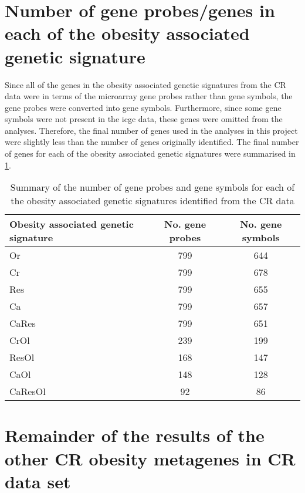 \begin{appendices}
	\section{Number of gene probes/genes in each of the obesity associated genetic signature}
	\label{app:number_of_gene_probes_genes_in_each_signature}

	Since all of the genes in the obesity associated genetic signatures from the CR data were in terms of the microarray gene probes rather than gene symbols, the gene probes were converted into gene symbols.
	Furthermore, since some gene symbols were not present in the \gls{icgc} data, these genes were omitted from the analyses.
	Therefore, the final number of genes used in the analyses in this project were slightly less than the number of genes originally identified.
	The final number of genes for each of the obesity associated genetic signatures were summarised in \cref{tab:signature_gene_num}.

	\begin{table}[htbp]
		\centering
		\caption{Summary of the number of gene probes and gene symbols for each of the obesity associated genetic signatures identified from the CR data}
		\label{tab:signature_gene_num}
		\begin{tabular}{lcc}
			Obesity associated genetic signature & No. gene probes   & No. gene symbols\\
			\hline
			\rule{0pt}{2.25ex}Or & 799 & 644 \\
			Cr                   & 799 & 678 \\
			Res                  & 799 & 655 \\
			Ca                   & 799 & 657 \\
			CaRes                & 799 & 651 \\
			CrOl                 & 239 & 199 \\
			ResOl                & 168 & 147 \\
			CaOl                 & 148 & 128 \\
			CaResOl              & 92  & 86  \\
			\hline
			\hline
		\end{tabular}
	\end{table}

	\section{Remainder of the results of the other CR obesity metagenes in CR data set}
	\label{sec:rest_of_the_cr_ob_meta_heatmap_results}


\end{appendices}
